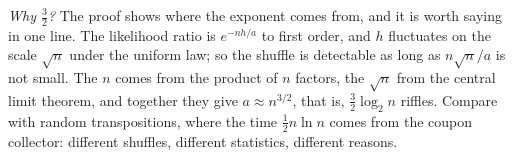 \emph{Why $\frac32$?} The proof shows where the exponent comes from, and it is worth saying in one line. The likelihood ratio is $e^{-nh/a}$ to first order, and $h$ fluctuates
on the scale $\sqrt n$ under the uniform law; so the shuffle is detectable as long as $n\sqrt n/a$ is not small. The $n$ comes from the product of $n$ factors, the $\sqrt n$ from
the central limit theorem, and together they give $a\approx n^{3/2}$, that is, $\frac32\log_2n$ riffles. Compare with random transpositions, where the time
$\frac12n\ln n$ comes from the coupon collector: different shuffles, different statistics, different reasons.
